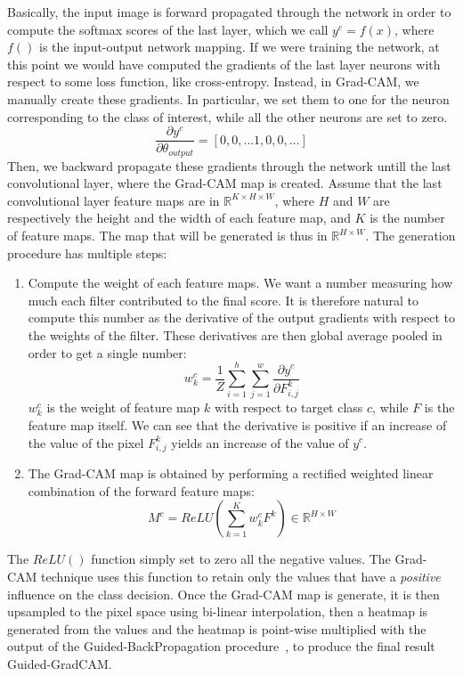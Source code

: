 \documentclass[../main.tex]{subfiles}
\begin{document}
    Basically, the input image is forward propagated through the network in order to compute the softmax scores
    of the last layer, which we call $y^{c} = f(x)$, where $f()$ is the input-output network mapping.
    If we were training the network, at this point we would have computed the gradients of the
    last layer neurons with respect to some loss function, like cross-entropy. Instead, in Grad-CAM, we manually
    create these gradients. In particular, we set them to one for the neuron corresponding to the class of interest,
    while all the other neurons are set to zero.
    $$ \frac{\partial y^{c}}{\partial \theta_{output}} = [0, 0, \ldots 1, 0, 0, \ldots] $$
    Then, we backward propagate these gradients through the network untill
    the last convolutional layer, where the Grad-CAM map is created. Assume that the last convolutional layer feature maps are
    in $ \mathbb{R}^{K \times H \times W} $, where $H$ and $W$ are respectively the height and the width of each feature
    map, and $K$ is the number of feature maps. The map that will be generated is thus in $\mathbb{R}^{H \times W}$.
    The generation procedure has multiple steps:
    \begin{enumerate}
        \item Compute the weight of each feature maps. We want a number measuring how much each filter contributed to
            the final score. It is therefore natural to compute this number as the derivative of the output gradients
            with respect to the weights of the filter. These derivatives are then global average pooled in order to get
            a single number:
            \begin{equation}
                w_{k}^{c} = \frac{1}{Z} \sum_{i = 1}^{h} \sum_{j = 1}^{w} \frac{\partial y^{c}}{\partial F_{i, j}^{k}}
            \end{equation}
            $w_{k}^{c}$ is the weight of feature map $k$ with respect to target class $c$, while $F$ is the feature map
            itself. We can see that the derivative is positive if an increase of the value of the pixel $F_{i, j}^{k}$ yields
            an increase of the value of $y^{c}$.
        \item The Grad-CAM map is obtained by performing a rectified weighted linear combination of the forward feature maps:
            \begin{equation}\label{eq:gradcamMaps}
                M^{c} = ReLU \left( \sum_{k = 1}^{K} w_{k}^{c} F^{k} \right) \in \mathbb{R}^{H \times W}
            \end{equation}
    \end{enumerate}
    The $ReLU()$ function simply set to zero all the negative values. The Grad-CAM technique uses this function to retain only
    the values that have a \textit{positive} influence on the class decision.
    Once the Grad-CAM map is generate, it is then upsampled to the pixel space using bi-linear interpolation, then a heatmap
    is generated from the values and the heatmap is point-wise multiplied with the output of the Guided-BackPropagation
    procedure~\cite{guidedbackprop}, to produce the final result Guided-GradCAM.\@
\end{document}
